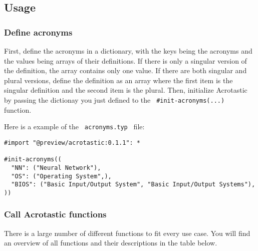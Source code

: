 \subsection{Usage}\label{usage}

\subsubsection{Define acronyms}\label{define-acronyms}

First, define the acronyms in a dictionary, with the keys being the
acronyms and the values being arrays of their definitions. If there is
only a singular version of the definition, the array contains only one
value. If there are both singular and plural versions, define the
definition as an array where the first item is the singular definition
and the second item is the plural. Then, initialize Acrotastic by
passing the dictionay you just defined to the
\texttt{\ \#init-acronyms(...)\ } function.

Here is a example of the \texttt{\ acronyms.typ\ } file:

\begin{verbatim}
#import "@preview/acrotastic:0.1.1": *

#init-acronyms((
  "NN": ("Neural Network"),
  "OS": ("Operating System",),
  "BIOS": ("Basic Input/Output System", "Basic Input/Output Systems"),
))
\end{verbatim}

\subsubsection{Call Acrotastic
functions}\label{call-acrotastic-functions}

There is a large number of different functions to fit every use case.
You will find an overview of all functions and their descriptions in the
table below.

